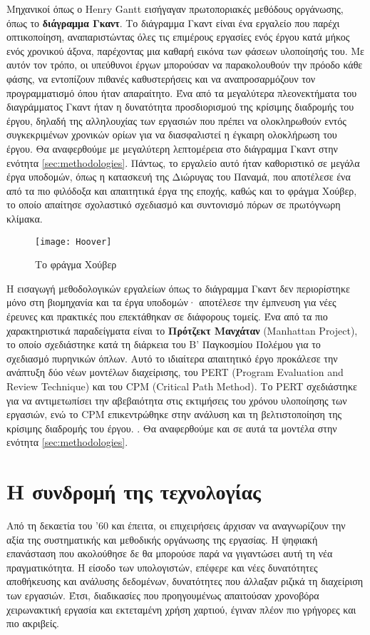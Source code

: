             Μηχανικοί όπως ο Henry Gantt εισήγαγαν πρωτοποριακές μεθόδους οργάνωσης, όπως το \textbf{διάγραμμα Γκαντ}. Το διάγραμμα Γκαντ είναι ένα εργαλείο που παρέχι οπτικοποίηση, αναπαριστώντας όλες τις επιμέρους εργασίες ενός έργου κατά μήκος ενός χρονικού άξονα, παρέχοντας μια καθαρή εικόνα των φάσεων υλοποίησής του. Με αυτόν τον τρόπο, οι υπεύθυνοι έργων μπορούσαν να παρακολουθούν την πρόοδο κάθε φάσης, να εντοπίζουν πιθανές καθυστερήσεις και να αναπροσαρμόζουν τον προγραμματισμό όπου ήταν απαραίτητο. Ένα από τα μεγαλύτερα πλεονεκτήματα του διαγράμματος Γκαντ ήταν η δυνατότητα προσδιορισμού της κρίσιμης διαδρομής του έργου, δηλαδή της αλληλουχίας των εργασιών που πρέπει να ολοκληρωθούν εντός συγκεκριμένων χρονικών ορίων για να διασφαλιστεί η έγκαιρη ολοκλήρωση του έργου. Θα αναφερθούμε με μεγαλύτερη λεπτομέρεια στο διάγραμμα Γκαντ στην ενότητα \ref{sec:methodologies}. Πάντως, το εργαλείο αυτό ήταν καθοριστικό σε μεγάλα έργα υποδομών, όπως η κατασκευή της Διώρυγας του Παναμά, που αποτέλεσε ένα από τα πιο φιλόδοξα και απαιτητικά έργα της εποχής, καθώς και το φράγμα Χούβερ, το οποίο απαίτησε σχολαστικό σχεδιασμό και συντονισμό πόρων σε πρωτόγνωρη κλίμακα. \cite{strefapmiHooverGreatest}

            \begin{figure}[h!] \noindent \centering
                \texttt{[image: Hoover]}
                \caption{\centering Το φράγμα Χούβερ \cite{britannicaHoover}}
            \end{figure}

            Η εισαγωγή μεθοδολογικών εργαλείων όπως το διάγραμμα Γκαντ δεν περιορίστηκε μόνο στη βιομηχανία και τα έργα υποδομών· αποτέλεσε την έμπνευση για νέες έρευνες και πρακτικές που επεκτάθηκαν σε διάφορους τομείς. Ένα από τα πιο χαρακτηριστικά παραδείγματα είναι το \textbf{Πρότζεκτ Μανχάταν} (Manhattan Project), το οποίο σχεδιάστηκε κατά τη διάρκεια του Β' Παγκοσμίου Πολέμου για το σχεδιασμό πυρηνικών όπλων. Αυτό το ιδιαίτερα απαιτητικό έργο προκάλεσε την ανάπτυξη δύο νέων μοντέλων διαχείρισης, του PERT (Program Evaluation and Review Technique) και του CPM (Critical Path Method). Το PERT σχεδιάστηκε για να αντιμετωπίσει την αβεβαιότητα στις εκτιμήσεις του χρόνου υλοποίησης των εργασιών, ενώ το CPM επικεντρώθηκε στην ανάλυση και τη βελτιστοποίηση της κρίσιμης διαδρομής του έργου. \cite{SaylorAcademyProjectManagement}. Θα αναφερθούμε και σε αυτά τα μοντέλα στην ενότητα \ref{sec:methodologies}.


    \section{Η συνδρομή της τεχνολογίας}
        Από τη δεκαετία του '60 και έπειτα, οι επιχειρήσεις άρχισαν να αναγνωρίζουν την αξία της συστηματικής και μεθοδικής οργάνωσης της εργασίας. Η ψηφιακή επανάσταση που ακολούθησε δε θα μπορούσε παρά να γιγαντώσει αυτή τη νέα πραγματικότητα. Η είσοδο των υπολογιστών, επέφερε και νέες δυνατότητες αποθήκευσης και ανάλυσης δεδομένων, δυνατότητες που άλλαξαν ριζικά τη διαχείριση των εργασιών. Έτσι, διαδικασίες που προηγουμένως απαιτούσαν χρονοβόρα χειρωνακτική εργασία και εκτεταμένη χρήση χαρτιού, έγιναν πλέον πιο γρήγορες και πιο ακριβείς.

